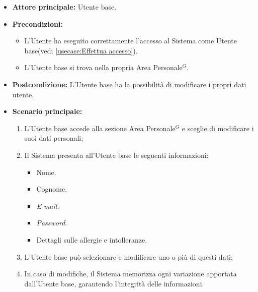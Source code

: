 \label{usecase:Visualizzazione e modifica dati utente}
\begin{itemize}
	\item \textbf{Attore principale:} Utente base.

	\item \textbf{Precondizioni:}
	\begin{itemize}
        \item L'Utente ha eseguito correttamente l'accesso al Sistema come Utente base(vedi \autoref{usecase:Effettua accesso}).
        \item L'Utente base si trova nella propria Area Personale$^G$.
    \end{itemize}

	\item \textbf{Postcondizione:} L'Utente base ha la possibilità di modificare i propri dati utente.

	\item \textbf{Scenario principale:}
	      \begin{enumerate}
		      \item L'Utente base accede alla sezione Area Personale$^G$ e sceglie di modificare i suoi dati personali;
		      \item Il Sistema presenta all'Utente base le seguenti informazioni:
              \begin{itemize}
                \item Nome.
                \item Cognome.
                \item \textit{E-mail}.
                \item \textit{Password}.
                \item Dettagli sulle allergie e intolleranze.
              \end{itemize}
              \item L'Utente base può selezionare e modificare uno o più di questi dati;
              \item In caso di modifiche, il Sistema memorizza ogni variazione apportata dall'Utente base, garantendo l'integrità delle informazioni.
	      \end{enumerate}
\end{itemize}
